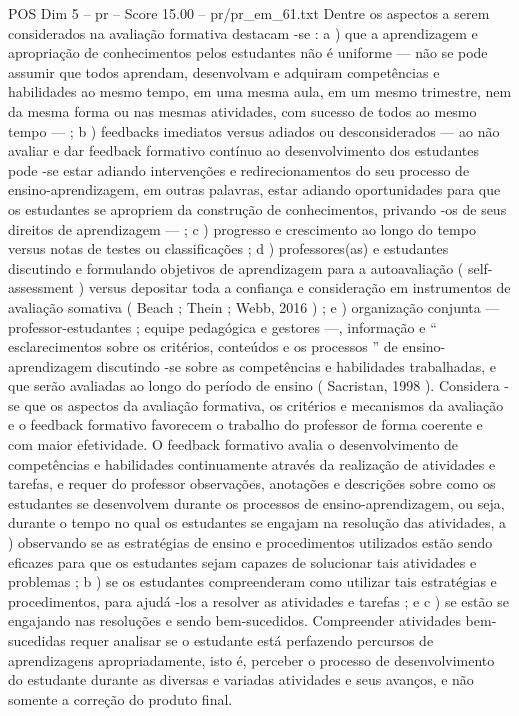 \begin{textsample}{POS Dim 5 – pr – Score 15.00 – pr/pr\_em\_61.txt}
Dentre os aspectos a serem considerados na avaliação formativa destacam -se : a ) que a aprendizagem e apropriação de conhecimentos pelos estudantes não é uniforme — não se pode assumir que todos aprendam, desenvolvam e adquiram competências e habilidades ao mesmo tempo, em uma mesma aula, em um mesmo trimestre, nem da mesma forma ou nas mesmas atividades, com sucesso de todos ao mesmo tempo — ; b ) feedbacks imediatos versus adiados ou desconsiderados — ao não avaliar e dar feedback formativo contínuo ao desenvolvimento dos estudantes pode -se estar adiando intervenções e redirecionamentos do seu processo de ensino-aprendizagem, em outras palavras, estar adiando oportunidades para que os estudantes se apropriem da construção de conhecimentos, privando -os de seus direitos de aprendizagem — ; c ) progresso e crescimento ao longo do tempo versus notas de testes ou classificações ; d ) professores(as) e estudantes discutindo e formulando objetivos de aprendizagem para a autoavaliação ( self-assessment ) versus depositar toda a confiança e consideração em instrumentos de avaliação somativa ( Beach ; Thein ; Webb, 2016 ) ; e ) organização conjunta — professor-estudantes ; equipe pedagógica e gestores —, informação e “ esclarecimentos sobre os critérios, conteúdos e os processos ” de ensino-aprendizagem discutindo -se sobre as competências e habilidades trabalhadas, e que serão avaliadas ao longo do período de ensino ( Sacristan, 1998 ).
Considera -se que os aspectos da avaliação formativa, os critérios e mecanismos da avaliação e o feedback formativo favorecem o trabalho do professor de forma coerente e com maior efetividade.
O feedback formativo avalia o desenvolvimento de competências e habilidades continuamente através da realização de atividades e tarefas, e requer do professor observações, anotações e descrições sobre como os estudantes se desenvolvem durante os processos de ensino-aprendizagem, ou seja, durante o tempo no qual os estudantes se engajam na resolução das atividades, a ) observando se as estratégias de ensino e procedimentos utilizados estão sendo eficazes para que os estudantes sejam capazes de solucionar tais atividades e problemas ; b ) se os estudantes compreenderam como utilizar tais estratégias e procedimentos, para ajudá -los a resolver as atividades e tarefas ; e c ) se estão se engajando nas resoluções e sendo bem-sucedidos.
Compreender atividades bem-sucedidas requer analisar se o estudante está perfazendo percursos de aprendizagens apropriadamente, isto é, perceber o processo de desenvolvimento do estudante durante as diversas e variadas atividades e seus avanços, e não somente a correção do produto final.

\end{textsample}
